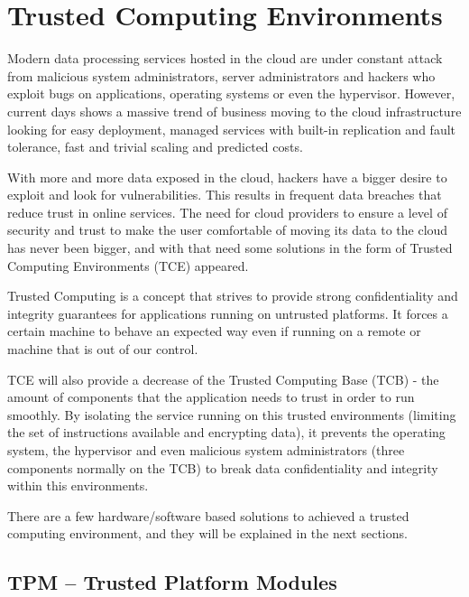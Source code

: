 \section{Trusted  Computing Environments} %
\label{sec:trusted_computing _environments}

Modern data processing services hosted in the cloud are under constant attack from malicious system administrators, server administrators and hackers who exploit bugs on applications, operating systems or even the hypervisor. However, current days shows a massive trend of business moving to the cloud infrastructure looking for easy deployment, managed services with built-in replication and fault tolerance, fast and trivial scaling and predicted costs.

With more and more data exposed in the cloud, hackers have a bigger desire to exploit and look for vulnerabilities. This results in frequent data breaches that reduce trust in online services. The need for cloud providers to ensure a level of security and trust to make the user comfortable of moving its data to the cloud has never been bigger, and with that need some solutions in the form of Trusted Computing Environments (\gls{TCE}) appeared.

Trusted Computing is a concept that strives to provide strong confidentiality and integrity guarantees for applications running on untrusted platforms. It forces a certain machine to behave an expected way even if running on a remote or machine that is out of our control.

\gls{TCE} will also provide a decrease of the Trusted Computing Base (\gls{TCB}) - the amount of components that the application needs to trust in order to run smoothly. By isolating the service running on this trusted environments (limiting the set of instructions available and encrypting data), it prevents the operating system, the hypervisor and even malicious system administrators (three components normally on the \gls{TCB}) to break data confidentiality and integrity within this environments.

There are a few hardware/software based solutions to achieved a trusted computing environment, and they will be explained in the next sections.

\subsection{TPM – Trusted Platform Modules } %
\label{ssec:trusted_platform_modules}

